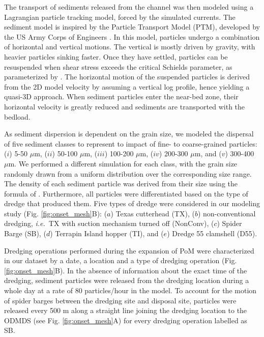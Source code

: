 \documentclass[preprint,12pt,authoryear]{elsarticle}
\newcommand{\ie}{{\it i.e.}\ }
\begin{document}
The transport of sediments released from the channel was then modeled using a Lagrangian particle tracking model, forced by the simulated currents. The sediment model is inspired by the Particle Transport Model (PTM), developed by the US Army Corps of Engineers \citep{macdonald2006ptm}. In this model, particles undergo a combination of horizontal and vertical motions. The vertical is mostly driven by gravity, with heavier particles sinking faster. Once they have settled, particles can be resuspended when shear stress exceeds   the critical Schields parameter, as parameterized by \cite{soulsby1997threshold}. The horizontal motion of the suspended particles is derived from the 2D model velocity by assuming a vertical log profile, hence yielding a quasi-3D approach. When sediment particles enter the near-bed zone, their horizontal velocity is greatly reduced and sediments are transported with the bedload.   

As sediment dispersion is dependent on the grain size, we modeled the dispersal of five sediment classes to represent to impact of fine- to coarse-grained particles: ($i$) 5-50 $\mu$m, ($ii$) 50-100 $\mu$m, ($iii$) 100-200 $\mu$m, ($iv$) 200-300 $\mu$m, and ($v$) 300-400 $\mu$m. We performed a  different simulation for each class, with the grain size randomly drawn from a uniform distribution over the corresponding size range. The density of each sediment particle was derived from their size using the formula of \cite{hamilton1982sound}. Furthermore, all particles were differentiated based on the type of dredge that produced them. Five types of dredge were considered in our modeling study (Fig. \ref{fig:onset_mesh}B): ($a$) Texas cutterhead (TX), ($b$) non-conventional dredging, \ie TX with suction mechanism turned off (NonConv), ($c$) Spider Barge (SB), ($d$) Terrapin Island hopper (TI), and ($e$) Dredge 55 clamshell (D55).

Dredging operations performed during the expansion of PoM were characterized in our dataset by a date, a location and  a type of dredging operation (Fig. \ref{fig:onset_mesh}B). In the absence of information about the exact time of the dredging, sediment particles were released from the dredging location during a whole day at a rate of 80 particles/hour in the model. To account for the motion of spider barges between the dredging site and disposal site, particles were released every 500 m along a straight line joining the dredging location to the ODMDS (see Fig. \ref{fig:onset_mesh}A) for every dredging operation labelled as SB.
\end{document}
